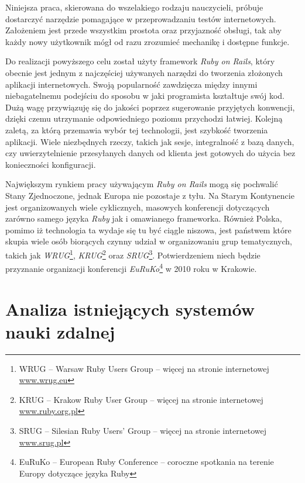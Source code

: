 \documentclass[12pt,twoside]{report}
\begin{document}
Niniejsza praca, skierowana do wszelakiego rodzaju nauczycieli, próbuje dostarczyć
narzędzie pomagające w przeprowadzaniu testów internetowych. Założeniem jest przede
wszystkim prostota oraz przyjazność obsługi, tak aby każdy nowy użytkownik mógł od razu
zrozumieć mechanikę i dostępne funkcje.


Do realizacji powyższego celu został użyty framework \emph{Ruby on Rails}, który obecnie
jest jednym z najczęściej używanych narzędzi do tworzenia złożonych aplikacji internetowych.
Swoją popularność zawdzięcza między innymi niebagatelnemu podejściu do sposobu w jaki
programista kształtuje swój kod. Dużą wagę przywiązuję się do jakości poprzez sugerowanie
przyjętych konwencji, dzięki czemu utrzymanie odpowiedniego poziomu przychodzi łatwiej.
Kolejną zaletą, za którą przemawia wybór tej technologii, jest szybkość tworzenia
aplikacji. Wiele niezbędnych rzeczy, takich jak sesje, integralność z bazą danych,
czy uwierzytelnienie przesyłanych danych od klienta jest gotowych do użycia bez konieczności
konfiguracji.


Największym rynkiem pracy używającym \emph{Ruby on Rails} mogą się pochwalić Stany
Zjednoczone, jednak Europa nie pozostaje z tyłu. Na Starym Kontynencie jest organizowanych
wiele cyklicznych, masowych konferencji dotyczących zarówno samego języka \emph{Ruby} jak
i omawianego frameworka. Również Polska, pomimo iż technologia ta wydaje się tu być ciągle
niszowa, jest państwem które skupia wiele osób biorących czynny udział w organizowaniu
grup tematycznych, takich jak \emph{WRUG}\footnote{WRUG -- Warsaw Ruby Users Group -- więcej
na stronie internetowej \url{www.wrug.eu}}, \emph{KRUG}\footnote{KRUG -- Krakow Ruby User Group
-- więcej na stronie internetowej \url{www.ruby.org.pl}} oraz \emph{SRUG}\footnote{SRUG -- Silesian Ruby
Users' Group -- więcej na stronie internetowej \url{www.srug.pl}}. Potwierdzeniem niech
będzie przyznanie organizacji konferencji \emph{EuRuKo}\footnote{EuRuKo -- European Ruby
Conference -- coroczne spotkania na terenie Europy dotyczące języka Ruby} w 2010 roku w Krakowie.


\chapter{Analiza istniejących systemów nauki zdalnej}
\end{document}
